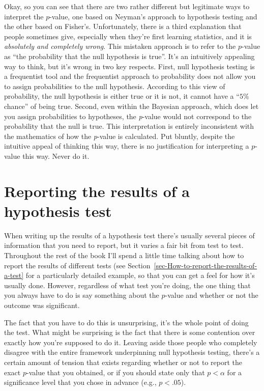 \documentclass[
  a4paper,
]{book}
\begin{document}
Okay, so you can see that there are two rather different but legitimate
ways to interpret the \(p\)-value, one based on Neyman's approach to
hypothesis testing and the other based on Fisher's. Unfortunately, there
is a third explanation that people sometimes give, especially when
they're first learning statistics, and it is \emph{absolutely and
completely wrong}. This mistaken approach is to refer to the \(p\)-value
as ``the probability that the null hypothesis is true''. It's an
intuitively appealing way to think, but it's wrong in two key respects.
First, null hypothesis testing is a frequentist tool and the frequentist
approach to probability does not allow you to assign probabilities to
the null hypothesis. According to this view of probability, the null
hypothesis is either true or it is not, it cannot have a ``\(5\%\)
chance'' of being true. Second, even within the Bayesian approach, which
does let you assign probabilities to hypotheses, the \emph{p}-value
would not correspond to the probability that the null is true. This
interpretation is entirely inconsistent with the mathematics of how the
\emph{p}-value is calculated. Put bluntly, despite the intuitive appeal
of thinking this way, there is no justification for interpreting a
\(p\)-value this way. Never do it.

\hypertarget{reporting-the-results-of-a-hypothesis-test}{%
\section{Reporting the results of a hypothesis
test}\label{reporting-the-results-of-a-hypothesis-test}}

When writing up the results of a hypothesis test there's usually several
pieces of information that you need to report, but it varies a fair bit
from test to test. Throughout the rest of the book I'll spend a little
time talking about how to report the results of different tests (see
Section~\ref{sec-How-to-report-the-results-of-a-test} for a particularly
detailed example, so that you can get a feel for how it's usually done.
However, regardless of what test you're doing, the one thing that you
always have to do is say something about the \(p\)-value and whether or
not the outcome was significant.

The fact that you have to do this is unsurprising, it's the whole point
of doing the test. What might be surprising is the fact that there is
some contention over exactly how you're supposed to do it. Leaving aside
those people who completely disagree with the entire framework
underpinning null hypothesis testing, there's a certain amount of
tension that exists regarding whether or not to report the exact
\(p\)-value that you obtained, or if you should state only that
\(p < \alpha\) for a significance level that you chose in advance (e.g.,
\(p < .05\)).
\end{document}
